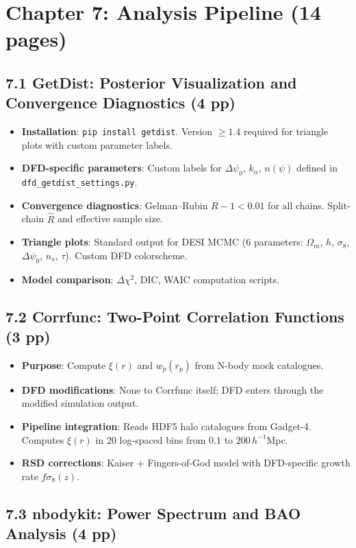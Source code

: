 \documentclass[11pt,a4paper]{article}
\begin{document}
\section{Chapter 7: Analysis Pipeline (14 pages)}

\subsection{7.1 GetDist: Posterior Visualization and Convergence Diagnostics (4 pp)}

\begin{itemize}
\item \textbf{Installation}: \texttt{pip install getdist}. Version $\geq 1.4$ required for triangle plots with custom parameter labels.
\item \textbf{DFD-specific parameters}: Custom labels for $\Delta\psi_0$, $k_\alpha$, $n(\psi)$ defined in \texttt{dfd\_getdist\_settings.py}.
\item \textbf{Convergence diagnostics}: Gelman--Rubin $R-1 < 0.01$ for all chains. Split-chain $\hat{R}$ and effective sample size.
\item \textbf{Triangle plots}: Standard output for DESI MCMC (6 parameters: $\Omega_m$, $h$, $\sigma_8$, $\Delta\psi_0$, $n_s$, $\tau$). Custom DFD colorscheme.
\item \textbf{Model comparison}: $\Delta\chi^2$, DIC, WAIC computation scripts.
\end{itemize}

\subsection{7.2 Corrfunc: Two-Point Correlation Functions (3 pp)}

\begin{itemize}
\item \textbf{Purpose}: Compute $\xi(r)$ and $w_p(r_p)$ from N-body mock catalogues.
\item \textbf{DFD modifications}: None to Corrfunc itself; DFD enters through the modified simulation output.
\item \textbf{Pipeline integration}: Reads HDF5 halo catalogues from Gadget-4. Computes $\xi(r)$ in 20 log-spaced bins from $0.1$ to $200 \, h^{-1}$Mpc.
\item \textbf{RSD corrections}: Kaiser + Fingers-of-God model with DFD-specific growth rate $f\sigma_8(z)$.
\end{itemize}

\subsection{7.3 nbodykit: Power Spectrum and BAO Analysis (4 pp)}
\end{document}
